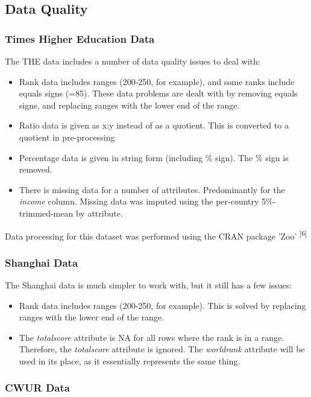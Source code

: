 \documentclass[12pt]{article}
\begin{document}
\subsection{Data Quality}

\subsubsection{Times Higher Education Data}

The THE data includes a number of data quality issues to deal with:
\begin{itemize}
\item Rank data includes ranges (200-250, for example), and some ranks include equals signs (=85). These data problems are dealt with by removing equals signs, and replacing ranges with the lower end of the range.
\item Ratio data is given as x:y instead of as a quotient. This is converted to a quotient in pre-processing
\item Percentage data is given in string form (including \% sign). The \% sign is removed.
\item There is missing data for a number of attributes. Predominantly for the \textit{income} column. Missing data was imputed using the per-country 5\%-trimmed-mean by attribute.
\end{itemize}
Data processing for this dataset was performed using the CRAN package 'Zoo' \textsuperscript{[6]}

\subsubsection{Shanghai Data}

The Shanghai data is much simpler to work with, but it still has a few issues:
\begin{itemize}
\item Rank data includes ranges (200-250, for example). This is solved by replacing ranges with the lower end of the range.
\item The \textit{total\textunderscore score} attribute is NA for all rows where the rank is in a range. Therefore, the \textit{total\textunderscore score} attribute is ignored. The \textit{world\textunderscore rank} attribute will be used in its place, as it essentially represents the same thing.
\end{itemize}


\subsubsection{CWUR Data}
\end{document}
